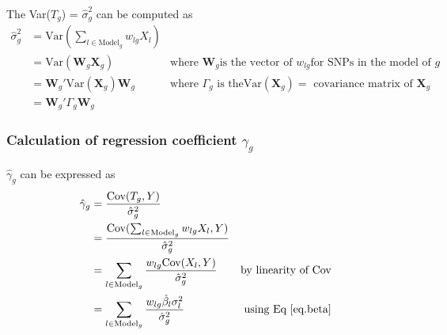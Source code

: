 \documentclass[10pt]{article}
\begin{document}
The Var($T_g$) = $\hat\sigma^2_g$ can be computed as
\begin{align}
\hat\sigma^2_g & = \text{Var} \left ( \sum_{l \in \text{Model}_g} w_{lg} X_l \right )\nonumber  & \text{}\\  
& = \text{Var} (\mathbf{W}_g \mathbf{X}_g) \nonumber  & \text{where } \mathbf{W}_g \text{is the vector of } w_{lg} \text{for SNPs in the model of } g \\
& = \mathbf{W}_g' \text{Var}( \mathbf{X}_g )\mathbf{W}_g \nonumber  & \text{where } \Gamma_g \text{ is the} \text{Var}( \mathbf{X}_g ) = \text{ covariance matrix of } \mathbf{X}_g \\
& = \mathbf{W}_g'  \Gamma_g \mathbf{W}_g & \text{} \label{eq.var.g}
\end{align}

\subsubsection*{Calculation of regression coefficient $\gamma_g$}

$\hat\gamma_g$ can be expressed as
\begin{align}
\hat \gamma_g & = \frac{ \text{Cov}(T_g,Y) }{ \hat\sigma^2_g } & \nonumber \\
& = \frac{ \text{Cov}(\sum_{l \in \text{Model}_g} w_{lg}X_l,Y) }{ \hat\sigma^2_g } & \nonumber \\
& = \sum_{l\in \text{Model}_g} \frac{w_{lg} \text{Cov}(X_l, Y) }{ \hat\sigma^2_g } & \text{by linearity of Cov} \nonumber \\
& = \sum_{l\in \text{Model}_g} \frac{ w_{lg}\hat\beta_l \sigma^2_l }{ \hat\sigma^2_g } & \text{using Eq \ref{eq.beta}} \label{eq.gamma}
\end{align}
\end{document}
